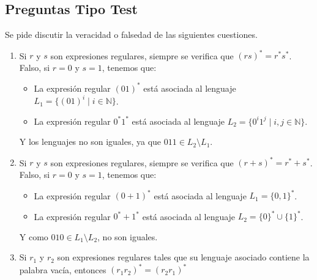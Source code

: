 \subsection{Preguntas Tipo Test}
Se pide discutir la veracidad o falsedad de las siguientes cuestiones.
\begin{enumerate}
    \item Si $r$ y $s$ son expresiones regulares, siempre se verifica que ${(rs)}^{\ast}=r^\ast s^\ast$.\\

        Falso, si $r = 0$ y $s = 1$, tenemos que:
        \begin{itemize}
            \item La expresión regular ${(01)}^{\ast}$ está asociada al lenguaje $L_1 = \{{(01)}^{i}\mid i \in \mathbb{N}\}$.
            \item La expresión regular $0^\ast 1^\ast$ está asociada al lenguaje $L_2 = \{0^i 1^j \mid i,j\in \mathbb{N}\}$.
        \end{itemize}
        Y los lenguajes no son iguales, ya que $011\in L_2 \setminus L_1$.
    \item Si $r$ y $s$ son expresiones regulares, siempre se verifica que ${(r+s)}^{\ast} = r^\ast + s^\ast$.\\

        Falso, si $r = 0$ y $s= 1$, tenemos que:
        \begin{itemize}
            \item La expresión regular ${(0+1)}^{\ast}$ está asociada al lenguaje $L_1={\{0,1\}}^{\ast}$.
            \item La expresión regular $0^\ast + 1^\ast$ está asociada al lenguaje $L_2 = {\{0\}}^{\ast}\cup {\{1\}}^{\ast}$.
        \end{itemize}
        Y como $010\in L_1\setminus L_2$, no son iguales.
    \item Si $r_1$ y $r_2$ son expresiones regulares tales que su lenguaje asociado contiene la palabra vacía, entonces ${(r_1r_2)}^{\ast}={(r_2r_1)}^{\ast}$\\


\end{enumerate}
